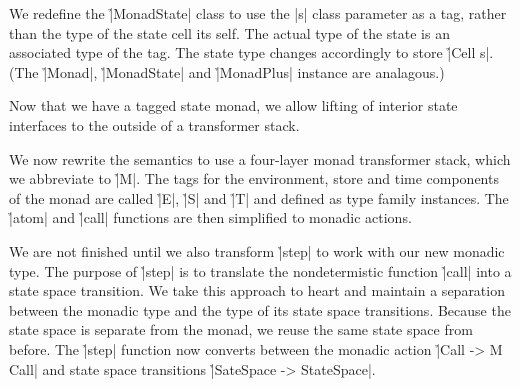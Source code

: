 
We redefine the \h|MonadState| class to use the \p|s| class parameter as a tag,
rather than the type of the state cell its self.
%
The actual type of the state is an associated type of the tag.
%
%
The state type changes accordingly to store \h|Cell s|.
%
%
(The \h|Monad|, \h|MonadState| and \h|MonadPlus| instance are analagous.)


Now that we have a tagged state monad, we allow lifting of interior state
interfaces to the outside of a transformer stack.
%


We now rewrite the semantics to use a four-layer monad transformer stack, which
we abbreviate to \h|M|.
%
The tags for the environment, store and time components of the monad are called
\h|E|, \h|S| and \h|T| and defined as type family instances.
%
%
The \h|atom| and \h|call| functions are then simplified to monadic actions.
%
%


We are not finished until we also transform \h|step| to work with our new
monadic type.
%
The purpose of \h|step| is to translate the nondetermistic function \h|call|
into a state space transition.
%
We take this approach to heart and maintain a separation between the monadic
type and the type of its state space transitions.
%
Because the state space is separate from the monad, we reuse the same state
space from before.
%
%
The \h|step| function now converts between the monadic action 
\h|Call -> M Call| and state space transitions \h|SateSpace -> StateSpace|.
%
